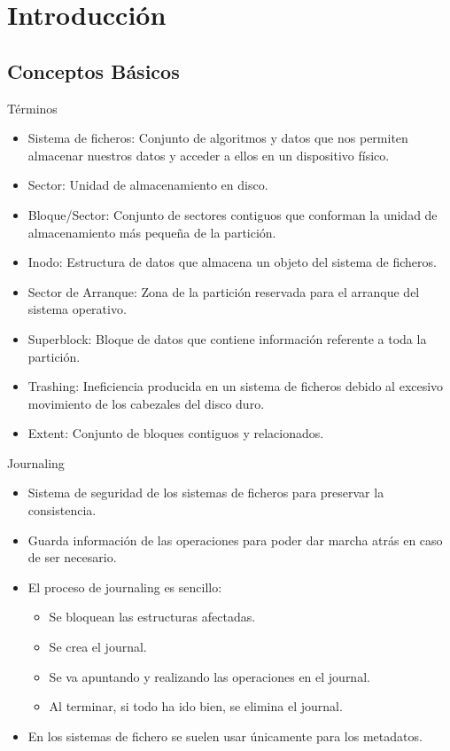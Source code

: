 \section*{Introducción}
\subsection*{Conceptos Básicos}
\begin{frame}{Términos}
  \begin{itemize}
    \item Sistema de ficheros: Conjunto de algoritmos y datos que nos permiten almacenar nuestros datos y acceder a ellos en un dispositivo físico.
    \item Sector: Unidad de almacenamiento en disco.
    \item Bloque/Sector: Conjunto de sectores contiguos que conforman la unidad de almacenamiento más pequeña de la partición.
    \item Inodo: Estructura de datos que almacena un objeto del sistema de ficheros.
    \item Sector de Arranque: Zona de la partición reservada para el arranque del sistema operativo.
    \item Superblock: Bloque de datos que contiene información referente a toda la partición.
    \item Trashing: Ineficiencia producida en un sistema de ficheros debido al excesivo movimiento de los cabezales del disco duro.
    \item Extent: Conjunto de bloques contiguos y relacionados.
  \end{itemize}
\end{frame}

\begin{frame}{Journaling}
  \begin{itemize}
    \item Sistema de seguridad de los sistemas de ficheros para preservar la consistencia.
    \item Guarda información de las operaciones para poder dar marcha atrás en caso de ser necesario.
    \item El proceso de journaling es sencillo:
    \begin{itemize}
      \item Se bloquean las estructuras afectadas.
      \item Se crea el journal.
      \item Se va apuntando y realizando las operaciones en el journal.
      \item Al terminar, si todo ha ido bien, se elimina el journal.
    \end{itemize}
    \item En los sistemas de fichero se suelen usar únicamente para los metadatos.
  \end{itemize}
\end{frame}

